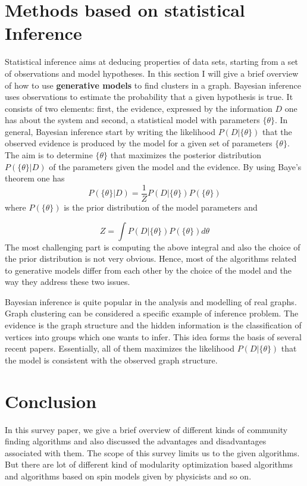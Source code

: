 \documentclass[letterpaper]{article}
\begin{document}
\section{Methods based on statistical Inference}
Statistical inference aims at deducing properties of data sets, starting from a
set of observations and model hypotheses. In this section I will give a brief
overview of how to use \textbf{generative models} to find clusters in a graph.
Bayesian inference uses observations to estimate the probability that a given
hypothesis is true.  It consists of two elements: first, the evidence,
expressed by the information $D$ one has about the system and second, a
statistical model with parameters $\{\theta\}$. In general, Bayesian inference
start by writing the likelihood $P(D|\{\theta\})$ that the observed evidence is
produced by the model for a given set of parameters $\{\theta\}$. The aim is to
determine $\{\theta\}$ that maximizes the posterior distribution
$P(\{\theta\}|D)$ of the parameters given the model and the evidence. By using Baye's theorem
one has 
\begin{equation}
P(\{\theta\}|D) = \frac{1}{Z}P(D|\{\theta\}) P(\{\theta\})
\end{equation}
where $P(\{\theta\})$ is the prior distribution of the model parameters and 

\begin{equation}
Z= \int P(D|\{\theta\}) P(\{\theta\}) d\theta
\end{equation}
The most challenging part is computing the above integral and also the choice
of the prior distribution is not very obvious. Hence, most of the algorithms
related to generative models differ from each other by the choice of the model
and the way they address these two issues.

Bayesian inference is quite popular in the analysis and modelling of real
graphs. Graph clustering can be considered a specific example of inference
problem. The evidence is the graph structure and the hidden information is the
classification of vertices into groups which one wants to infer. This idea
forms the basis of several recent papers. Essentially, all of them maximizes
the likelihood $P(D|\{\theta\})$ that the model is consistent with the observed
graph structure. 

\section{Conclusion}
In this survey paper, we give a brief overview of different kinds of community
finding algorithms and also discussed the advantages and disadvantages
associated with them. The scope of this survey limits us to the given
algorithms. But there are lot of different kind of modularity optimization
based algorithms and algorithms based on spin models given by physicists and so
on.
\end{document}
